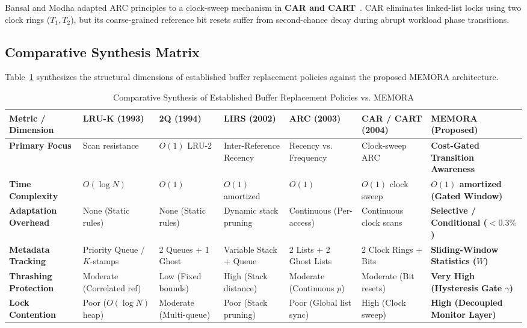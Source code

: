 \documentclass[conference]{IEEEtran}
\begin{document}
Bansal and Modha adapted ARC principles to a clock-sweep mechanism in \textbf{CAR and CART}~\cite{bansal2004car}. CAR eliminates linked-list locks using two clock rings ($T_1, T_2$), but its coarse-grained reference bit resets suffer from second-chance decay during abrupt workload phase transitions.

\subsection{Comparative Synthesis Matrix}
Table~\ref{tab:comparison} synthesizes the structural dimensions of established buffer replacement policies against the proposed MEMORA architecture.

\begin{table}[t]
\centering
\caption{Comparative Synthesis of Established Buffer Replacement Policies vs. MEMORA}
\label{tab:comparison}
\begin{tabular}{@{}lllllll@{}}
\toprule
\textbf{Metric / Dimension} & \textbf{LRU-K (1993)} & \textbf{2Q (1994)} & \textbf{LIRS (2002)} & \textbf{ARC (2003)} & \textbf{CAR / CART (2004)} & \textbf{MEMORA (Proposed)} \\
\midrule
\textbf{Primary Focus} & Scan resistance & $O(1)$ LRU-2 & Inter-Reference Recency & Recency vs. Frequency & Clock-sweep ARC & \textbf{Cost-Gated Transition Awareness} \\
\textbf{Time Complexity} & $O(\log N)$ & $O(1)$ & $O(1)$ amortized & $O(1)$ & $O(1)$ clock sweep & \textbf{$O(1)$ amortized (Gated Window)} \\
\textbf{Adaptation Overhead} & None (Static rules) & None (Static rules) & Dynamic stack pruning & Continuous (Per-access) & Continuous clock scans & \textbf{Selective / Conditional ($<0.3\%$)} \\
\textbf{Metadata Tracking} & Priority Queue / $K$-stamps & 2 Queues + 1 Ghost & Variable Stack + Queue & 2 Lists + 2 Ghost Lists & 2 Clock Rings + Bits & \textbf{Sliding-Window Statistics ($W$)} \\
\textbf{Thrashing Protection} & Moderate (Correlated ref) & Low (Fixed bounds) & High (Stack distance) & Moderate (Continuous $p$) & Moderate (Bit resets) & \textbf{Very High (Hysteresis Gate $\gamma$)} \\
\textbf{Lock Contention} & Poor ($O(\log N)$ heap) & Moderate (Multi-queue) & Poor (Stack pruning) & Poor (Global list sync) & High (Clock sweep) & \textbf{High (Decoupled Monitor Layer)} \\
\bottomrule
\end{tabular}
\end{table}
\end{document}
